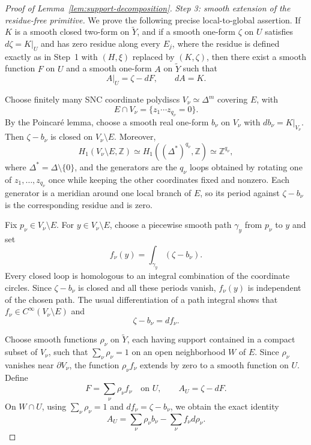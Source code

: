 \documentclass[reqno]{amsart}
\theoremstyle{plain}
\theoremstyle{remark}
\begin{document}
\begin{proof}[Proof of Lemma~\ref{lem:support-decomposition}]
\emph{Step 3: smooth extension of the residue-free primitive.}
We prove the following precise local-to-global assertion. If $K$ is
a smooth closed two-form on $\widetilde Y$, and if a smooth one-form
$\zeta$ on $U$ satisfies $d\zeta=K|_U$ and has zero residue along
every $E_j$, where the residue is defined exactly as in Step~1 with
$(H,\xi)$ replaced by $(K,\zeta)$, then there exist a smooth function
$F$ on $U$ and a smooth one-form $A$ on $\widetilde Y$ such that
\[
 A|_U=\zeta-dF,\qquad dA=K.
\]

Choose finitely many SNC coordinate polydiscs
$V_\nu\simeq\Delta^m$ covering $E$, with
\[
 E\cap V_\nu=\{z_1\cdots z_{q_\nu}=0\}.
\]
By the Poincar\'e lemma, choose
a smooth real one-form $b_\nu$ on $V_\nu$ with
$db_\nu=K|_{V_\nu}$.
Then $\zeta-b_\nu$ is closed on $V_\nu\setminus E$.  Moreover,
\[
 H_1(V_\nu\setminus E,\mathbb Z)
 \simeq H_1((\Delta^*)^{q_\nu},\mathbb Z)
 \simeq\mathbb Z^{q_\nu},
\]
where $\Delta^*=\Delta\setminus\{0\}$, and the generators are the
$q_\nu$ loops obtained by rotating one of
$z_1,\ldots,z_{q_\nu}$ once while keeping the other coordinates
fixed and nonzero.  Each generator is a meridian around one local
branch of $E$, so its period against $\zeta-b_\nu$ is the
corresponding residue and is zero.

Fix $p_\nu\in V_\nu\setminus E$.  For
$y\in V_\nu\setminus E$, choose a piecewise smooth path
$\gamma_y$ from $p_\nu$ to $y$ and set
\[
 f_\nu(y)=\int_{\gamma_y}(\zeta-b_\nu).
\]
Every closed loop is homologous to an integral combination of the
coordinate circles.  Since $\zeta-b_\nu$ is closed and all these
periods vanish, $f_\nu(y)$ is independent of the chosen path.
The usual differentiation of a path integral shows that
$f_\nu\in C^\infty(V_\nu\setminus E)$ and
\[
 \zeta-b_\nu=df_\nu.
\]

Choose smooth functions $\rho_\nu$ on $\widetilde Y$, each having support
contained in a compact subset of $V_\nu$, such that
$\sum_\nu\rho_\nu=1$ on an open neighborhood $W$ of $E$.
Since $\rho_\nu$ vanishes near $\partial V_\nu$, the function
$\rho_\nu f_\nu$ extends by zero to a smooth function on $U$.
Define
\[
 F=\sum_\nu\rho_\nu f_\nu\quad\text{on }U,
 \qquad A_U=\zeta-dF.
\]
On $W\cap U$, using $\sum_\nu\rho_\nu=1$ and
$df_\nu=\zeta-b_\nu$, we obtain the exact identity
\[
 A_U=\sum_\nu\rho_\nu b_\nu-\sum_\nu f_\nu d\rho_\nu.
\]


\end{proof}
\end{document}
